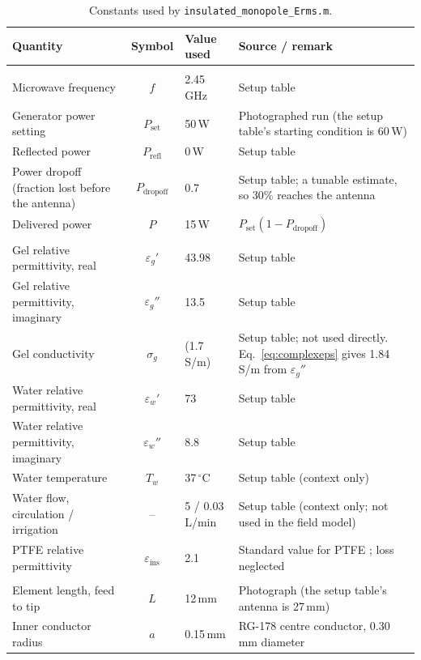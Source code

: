 \documentclass[11pt,a4paper]{article}
\newcommand{\eps}{\varepsilon}
\begin{document}
\begin{table}[tbp]
\centering
\caption{Constants used by \texttt{insulated\_monopole\_Erms.m}.}
\label{tab:constants}
\small
\begin{tabular}{>{\raggedright}p{4.6cm} c >{\raggedright}p{3.1cm} >{\raggedright\arraybackslash}p{5.2cm}}
\toprule
Quantity & Symbol & Value used & Source / remark \\
\midrule
\multicolumn{4}{l}{\emph{Excitation}}\\
Microwave frequency & $f$ & 2.45\,GHz & Setup table \\
Generator power setting & $P_{\text{set}}$ & 50\,W & Photographed run (the setup table's starting condition is 60\,W) \\
Reflected power & $P_{\text{refl}}$ & 0\,W & Setup table \\
Power dropoff (fraction lost before the antenna) & $P_{\text{dropoff}}$ & 0.7 & Setup table; a tunable estimate, so 30\% reaches the antenna \\
Delivered power & $P$ & 15\,W & $P_{\text{set}}(1-P_{\text{dropoff}})$ \\
\midrule
\multicolumn{4}{l}{\emph{Media}}\\
Gel relative permittivity, real & $\eps_g'$ & 43.98 & Setup table \\
Gel relative permittivity, imaginary & $\eps_g''$ & 13.5 & Setup table \\
Gel conductivity & $\sigma_g$ & (1.7\,S/m) & Setup table; not used directly. Eq.~\eqref{eq:complexeps} gives 1.84\,S/m from $\eps_g''$ \\
Water relative permittivity, real & $\eps_w'$ & 73 & Setup table \\
Water relative permittivity, imaginary & $\eps_w''$ & 8.8 & Setup table \\
Water temperature & $T_w$ & 37\,$^\circ$C & Setup table (context only) \\
Water flow, circulation / irrigation & -- & 5 / 0.03\,L/min & Setup table (context only; not used in the field model) \\
PTFE relative permittivity & $\eps_{\text{ins}}$ & 2.1 & Standard value for PTFE \cite{vonHippel1954}; loss neglected \\
\midrule
\multicolumn{4}{l}{\emph{Geometry}}\\
Element length, feed to tip & $L$ & 12\,mm & Photograph (the setup table's antenna is 27\,mm) \\
Inner conductor radius & $a$ & 0.15\,mm & RG-178 centre conductor, 0.30\,mm diameter \cite{MIL17} \\

\end{tabular}
\end{table}
\end{document}
